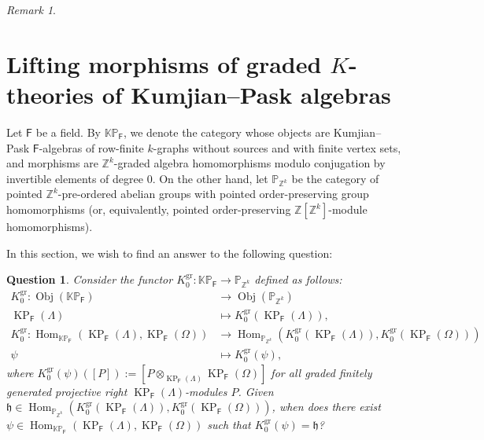 \documentclass[12pt]{amsart}
\newcommand{\Hom}{\operatorname{Hom}}
\newcommand{\Obj}{\operatorname{Obj}}
\newcommand{\KP}{\operatorname{KP}}
\newtheorem{ques}[thm]{Question}
\theoremstyle{definition}
\theoremstyle{remark}
\newtheorem{rmk}[thm]{Remark}
\newcommand{\gr}{\operatorname{gr}}
\begin{document}
\begin{rmk}
\end{rmk}

\section{Lifting morphisms of graded $K$-theories of Kumjian--Pask algebras}\label{sec lifting problem}
Let $\mathsf{F}$ be a field. By $\mathbb{K}\mathbb{P}_\mathsf{F}$, we denote the category whose objects are Kumjian--Pask $\mathsf{F}$-algebras of row-finite $k$-graphs without sources and with finite vertex sets, and morphisms are $\mathbb{Z}^k$-graded algebra homomorphisms modulo conjugation by invertible elements of degree $0$. On the other hand, let $\mathbb{P}_{\mathbb{Z}^k}$ be the category of pointed $\mathbb{Z}^k$-pre-ordered abelian groups with pointed order-preserving group homomorphisms (or, equivalently, pointed order-preserving $\mathbb{Z}[\mathbb{Z}^k]$-module homomorphisms).

In this section, we wish to find an answer to the following question:
\begin{ques}\label{ques lifting question}
Consider the functor $K_0^{\gr}:\mathbb{K}\mathbb{P}_\mathsf{F}\longrightarrow \mathbb{P}_{\mathbb{Z}^k}$ defined as follows:
\begin{align*}
K_0^{\gr}:\Obj(\mathbb{K}\mathbb{P}_\mathsf{F}) &\longrightarrow \Obj(\mathbb{P}_{\mathbb{Z}^k})\\
\KP_{\mathsf{F}}(\Lambda) &\longmapsto K_0^{\gr}(\KP_{\mathsf{F}}(\Lambda)),\\
K_0^{\gr}:\Hom_{\mathbb{K}\mathbb{P}_\mathsf{F}}(\KP_\mathsf{F}(\Lambda),\KP_\mathsf{F}(\Omega))&\longrightarrow \Hom_{\mathbb{P}_{\mathbb{Z}^k}}(K_0^{\gr}(\KP_{\mathsf{F}}(\Lambda)),K_0^{\gr}(\KP_{\mathsf{F}}(\Omega)))\\
\psi&\longmapsto K_0^{\gr}(\psi),
\end{align*}
where $K_0^{\gr}(\psi)([P]):=[P\otimes_{\KP_\mathsf{F}(\Lambda)}\KP_{\mathsf{F}}(\Omega)]$ for all graded finitely generated projective right $\KP_\mathsf{F}(\Lambda)$-modules $P$. Given $\mathfrak{h}\in \Hom_{\mathbb{P}_{\mathbb{Z}^k}}(K_0^{\gr}(\KP_{\mathsf{F}}(\Lambda)),K_0^{\gr}(\KP_{\mathsf{F}}(\Omega)))$, when does there exist $\psi\in \Hom_{\mathbb{K}\mathbb{P}_\mathsf{F}}(\KP_\mathsf{F}(\Lambda),\KP_\mathsf{F}(\Omega))$ such that $K_0^{\gr}(\psi)=\mathfrak{h}$?
\end{ques}
\end{document}
